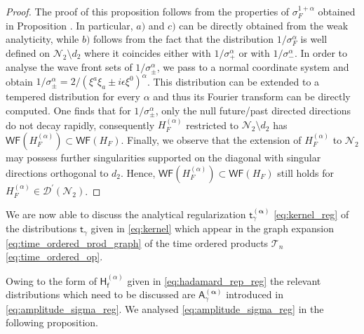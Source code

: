 \documentclass[11pt]{book}
\newcommand{\WF}{\mathsf{WF}}
\newcommand{\alphabd}{\boldsymbol{\alpha}}
\newcommand{\Dcal}{\mathcal{D}}
\newcommand{\Ncal}{\mathcal{N}}
\newcommand{\Tcal}{\mathcal{T}}
\newcommand{\Asf}{\mathsf{A}}
\newcommand{\Hsf}{\mathsf{H}}
\newcommand{\fsf}{\mathsf{f}}
\newcommand{\tsf}{\mathsf{t}}
\theoremstyle{break}
\begin{document}
\begin{proof}




The proof of this proposition follows from the properties of $\sigma_F^{1+\alpha}$ obtained in Proposition %
. In particular, $a)$ and $c)$ can be directly obtained from the weak analyticity, while $b)$ follows from the fact that the distribution $1/\sigma_F^\alpha$ is well defined on $\Ncal_2\setminus d_2$ where it coincides either with $1/\sigma_+^\alpha$ or with $1/\sigma_-^\alpha$. 
In order to analyse the wave front sets of $1/\sigma_\pm^\alpha$, we pass to a normal coordinate system and obtain $1/\sigma_\pm^\alpha=2/(\xi^a\xi_a\pm i\epsilon \xi^0)^\alpha$. This distribution can be extended to a tempered  distribution for every $\alpha$ and thus its Fourier transform can be directly computed. One finds that for $1/\sigma_\pm^\alpha$, only the null future/past directed directions do not decay rapidly, consequently $H_F^{(\alpha)}$ restricted to $\Ncal_2\setminus d_2$ has $\WF(H^{(\alpha)}_F)\subset \WF(H_F)$. Finally, we observe that the extension of $H^{(\alpha)}_F$ to $\Ncal_2$ may possess further singularities supported on the diagonal with singular directions orthogonal to $d_2$. Hence, $\WF(H^{(\alpha)}_F)\subset \WF(H_F)$ still holds for $H_F^{(\alpha)}\in\Dcal^\prime(\Ncal_2)$.



\end{proof}


We are now able to discuss the analytical regularization $\tsf^{(\alphabd)}_\gamma$ \eqref{eq:kernel_reg} of the distributions $\tsf_\gamma$ given in \eqref{eq:kernel} which appear in the graph expansion \eqref{eq:time_ordered_prod_graph} of the time ordered products $\Tcal_n$ \eqref{eq:time_ordered_op}. 


Owing to the form of $\Hsf^{(\alpha)}_\fsf$ given in \eqref{eq:hadamard_rep_reg} the relevant distributions which need to be discussed are $\Asf^{(\alphabd)}_\gamma$ introduced in \eqref{eq:amplitude_sigma_reg}. We analysed \eqref{eq:amplitude_sigma_reg} in the following proposition.
\end{document}
